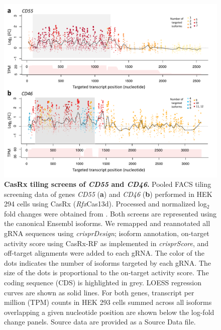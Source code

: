 \documentclass[pdftex,english,10pt]{article}
\begin{document}
\begin{figure}
\centering
\includegraphics[width=01\textwidth]{../analyses/casrx/sanjana//figures/casrx_supp_long.pdf}
  \caption{\textbf{CasRx tiling screens of \textit{CD55} and \textit{CD46}.}
Pooled FACS tiling screening data of genes \textit{CD55} (\textbf{a}) and \textit{CD46} (\textbf{b}) performed in HEK 294 cells using CasRx (\textit{Rfx}Cas13d). Processed and normalized log$_2$ fold changes were obtained from \citet{wessels2020massively}. Both screens are represented using the canonical Ensembl isoforms.  We remapped and reannotated all gRNA sequences using \textit{crisprDesign}; isoform annotation, on-target activity score using CasRx-RF as implemented in \textit{crisprScore}, and off-target alignments were added to each gRNA. The color of the dots indicates the number of isoforms targeted by each gRNA. The size of the dots is proportional to the on-target activity score. The coding sequence (CDS) is highlighted in grey. LOESS regression curves are shown as solid lines. For both genes, transcript per million (TPM) counts in HEK 293 cells summed across all isoforms overlapping a given nucleotide position are shown below the log-fold change panels. Source data are provided as a Source Data file.
}
  \label{suppfig:casrxlong}
\end{figure}
\end{document}
